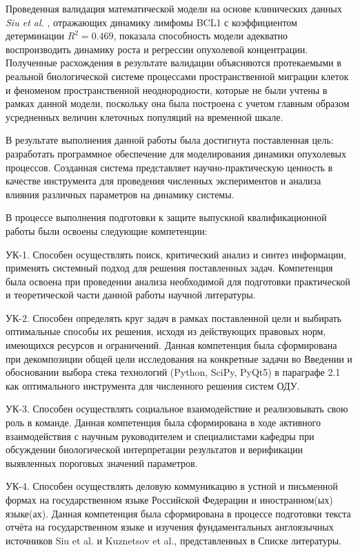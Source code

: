 Проведенная валидация математической модели на основе клинических данных
\textit{Siu et al.} \cite{Siu1986}, отражающих
динамику лимфомы BCL1 с коэффициентом детерминации $R^2 = 0.469$,
показала способность модели адекватно воспроизводить динамику роста и регрессии
опухолевой концентрации. Полученные расхождения в результате валидации
объясняются протекаемыми в реальной биологической системе процессами пространственной
миграции клеток и феноменом пространственной неоднородности, которые не были
учтены в рамках данной модели, поскольку она была построена с учетом главным образом
усредненных величин клеточных популяций на временной шкале.

В результате выполнения данной работы была достигнута поставленная цель:
разработать программное обеспечение для моделирования динамики опухолевых процессов.
Созданная система представляет научно-практическую ценность в качестве
инструмента для проведения численных экспериментов и анализа влияния различных
параметров на динамику системы.

В процессе выполнения подготовки к защите выпускной квалификационной работы были
освоены следующие компетенции:

УК-1. Способен осуществлять поиск, критический анализ и синтез информации,
применять системный подход для решения поставленных задач. Компетенция была
освоена при проведении анализа необходимой для подготовки практической и
теоретической части данной работы научной литературы.

УК-2. Способен определять круг задач в рамках поставленной цели и выбирать
оптимальные способы их решения, исходя из действующих правовых норм, имеющихся
ресурсов и ограничений. Данная компетенция была сформирована при декомпозиции
общей цели исследования на конкретные задачи во Введении и обосновании выбора
стека технологий (Python, SciPy, PyQt5) в параграфе 2.1 как оптимального
инструмента для численного решения систем ОДУ.

УК-3. Способен осуществлять социальное взаимодействие и реализовывать свою роль
в команде. Данная компетенция была сформирована в ходе активного взаимодействия
с научным руководителем и специалистами кафедры при обсуждении биологической
интерпретации результатов и верификации выявленных пороговых значений параметров.

УК-4. Способен осуществлять деловую коммуникацию в устной и письменной формах
на государственном языке Российской Федерации и иностранном(ых) языке(ах).
Данная компетенция была сформирована в процессе подготовки текста отчёта на
государственном языке и изучения фундаментальных англоязычных источников Siu et
al. и Kuznetsov et al., представленных в Списке литературы.

